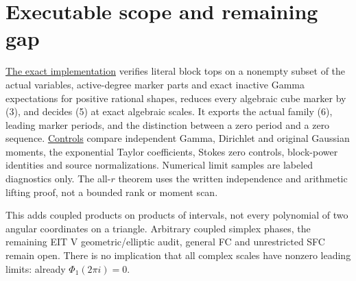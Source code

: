 \documentclass[11pt]{article}
\begin{document}
\section{Executable scope and remaining gap}
\href{coupled_block_periods.py}{The exact implementation} verifies literal
block tops on a nonempty subset of the actual variables, active-degree
marker parts and exact inactive Gamma expectations for positive rational shapes,
reduces every algebraic cube marker by (3), and decides (5) at exact
algebraic scales. It exports the actual family (6), leading marker
periods, and the distinction between a zero period and a zero sequence.
\href{verify_coupled_block_periods.py}{Controls} compare independent
Gamma, Dirichlet and original Gaussian moments, the exponential Taylor
coefficients, Stokes zero controls, block-power identities and source
normalizations. Numerical limit samples are labeled diagnostics only.
The all-$r$ theorem uses the written independence and arithmetic lifting
proof, not a bounded rank or moment scan.

This adds coupled products on products of intervals, not every polynomial
of two angular coordinates on a triangle. Arbitrary coupled simplex
phases, the remaining EIT V geometric/elliptic audit, general FC and
unrestricted SFC remain open. There is no implication that all complex
scales have nonzero leading limits: already $\Phi_1(2\pi i)=0$.
\end{document}

